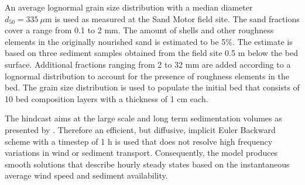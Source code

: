 \documentclass[preprint,12pt,authoryear]{elsarticle}
\begin{document}
An average lognormal grain size distribution with a median diameter
$d_{50} = 335 ~ \mu \mathrm{m}$ is used as measured at the Sand Motor
field site. The sand fractions cover a range from 0.1 to 2 mm. The
amount of shells and other roughness elements in the originally
nourished sand is estimated to be 5\%. The estimate is based on three
sediment samples obtained from the field site 0.5 m below the bed
surface. Additional fractions ranging from 2 to 32 mm are added
according to a lognormal distribution to account for the presence of
roughness elements in the bed. The grain size distribution is used to
populate the initial bed that consists of 10 bed composition layers
with a thickness of 1 cm each.

The hindcast aims at the large scale and long term sedimentation
volumes as presented by \citet{Hoonhout2017a}. Therefore an efficient,
but diffusive, implicit Euler Backward scheme with a timestep of 1 h
is used that does not resolve high frequency variations in wind or
sediment transport. Consequently, the model produces smooth solutions
that describe hourly steady states based on the instantaneous average
wind speed and sediment availability.
\end{document}
